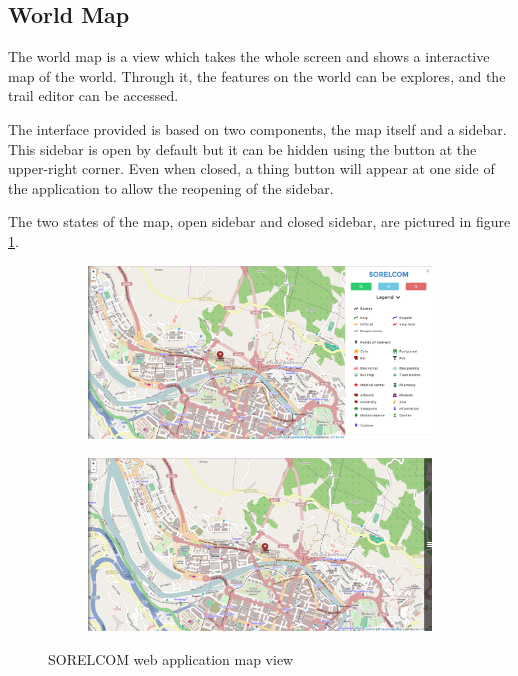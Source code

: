 \subsection{World Map}

The world map is a view which takes the whole screen and shows a interactive map of the world. Through it, the features on the world can be explores, and the trail editor can be accessed.

The interface provided is based on two components, the map itself and a sidebar. This sidebar is open by default but it can be hidden using the button at the upper-right corner. Even when closed, a thing button will appear at one side of the application to allow the reopening of the sidebar.

The two states of the map, open sidebar and closed sidebar, are pictured in figure \ref{fig:map-view}.

\begin{figure}[ht]
  \centering
  \begin{subfigure}{.45\textwidth}
    \centering
    \includegraphics[width=.9\textwidth]{fig/map-explore-sidebar}
  \end{subfigure}
  \begin{subfigure}{.45\textwidth}
    \centering
    \includegraphics[width=.9\textwidth]{fig/map-explore-no-sidebar}
  \end{subfigure}  
  \caption{SORELCOM web application map view}
  \label{fig:map-view}
\end{figure} 

